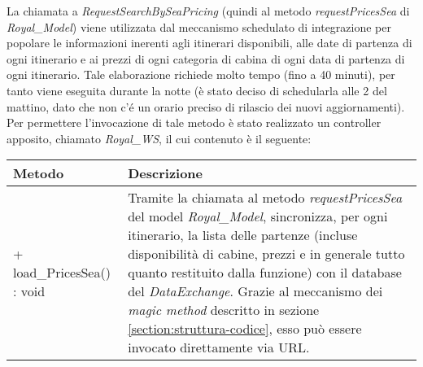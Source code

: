 La chiamata a \textit{RequestSearchBySeaPricing} (quindi al metodo \textit{requestPricesSea} di \textit{Royal\_Model}) viene utilizzata dal meccanismo schedulato di integrazione per popolare le informazioni inerenti agli itinerari disponibili, alle date di partenza di ogni itinerario e ai prezzi di ogni categoria di cabina di ogni data di partenza di ogni itinerario. Tale elaborazione richiede molto tempo (fino a 40 minuti), per tanto viene eseguita durante la notte (è stato deciso di schedularla alle 2 del mattino, dato che non c'é un orario preciso di rilascio dei nuovi aggiornamenti). \\
Per permettere l'invocazione di tale metodo è stato realizzato un controller apposito, chiamato \textit{Royal\_WS}, il cui contenuto è il seguente:
\begin{center}
	\def\arraystretch{1.5}
	\begin{longtable}{ >{\raggedright}p{5.5cm} p{6.8cm}} 
		\hline
		\textbf{Metodo} & \textbf{Descrizione} \\
		\hline
		+ load\_PricesSea() : void & Tramite la chiamata al metodo \textit{requestPricesSea} del model \textit{Royal\_Model}, sincronizza, per ogni itinerario, la lista delle partenze (incluse disponibilità di cabine, prezzi e in generale tutto quanto restituito dalla funzione) con il database del \textit{DataExchange}. Grazie al meccanismo dei \textit{magic method} descritto in sezione \ref{section:struttura-codice}, esso può essere invocato direttamente via URL.\\
		\hline
	\end{longtable}
\end{center}

